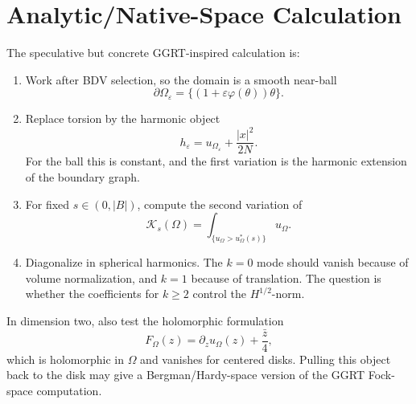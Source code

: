 \documentclass[11pt]{article}
\begin{document}
\section{Analytic/Native-Space Calculation}

The speculative but concrete GGRT-inspired calculation is:
\begin{enumerate}
\item Work after BDV selection, so the domain is a smooth near-ball
\[
\partial\Omega_\varepsilon
=
\{(1+\varepsilon\varphi(\theta))\theta\}.
\]
\item Replace torsion by the harmonic object
\[
h_\varepsilon=u_{\Omega_\varepsilon}+\frac{|x|^2}{2N}.
\]
For the ball this is constant, and the first variation is the harmonic
extension of the boundary graph.
\item For fixed \(s\in(0,|B|)\), compute the second variation of
\[
\mathcal K_s(\Omega)
=
\int_{\{u_\Omega>u_\Omega^*(s)\}}u_\Omega.
\]
\item Diagonalize in spherical harmonics. The \(k=0\) mode should vanish because
of volume normalization, and \(k=1\) because of translation. The question is
whether the coefficients for \(k\ge2\) control the \(H^{1/2}\)-norm.
\end{enumerate}

In dimension two, also test the holomorphic formulation
\[
F_\Omega(z)=\partial_z u_\Omega(z)+\frac{\bar z}{4},
\]
which is holomorphic in \(\Omega\) and vanishes for centered disks. Pulling this
object back to the disk may give a Bergman/Hardy-space version of the GGRT
Fock-space computation.
\end{document}

